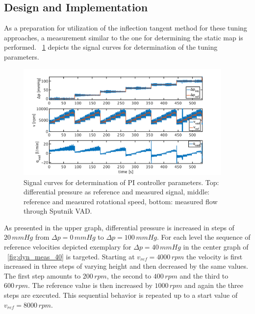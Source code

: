 \subsection{Design and Implementation}
As a preparation for utilization of the inflection tangent method for these tuning approaches, a measurement similar to the one for determining the static map is performed. \figurename~\ref{fig:dyn_meas} depicts the signal curves for determination of the tuning parameters.
\begin{figure}[ht]
  \centering
  \includegraphics[width=0.95\textwidth]{images/chapt_5/dyn_measure.pdf}
  \caption[Signal curves for determination of PI controller parameters]{Signal curves for determination of PI controller parameters. Top: differential pressure as reference and measured signal, middle: reference and measured rotational speed, bottom: measured flow through Sputnik VAD.}
  \label{fig:dyn_meas}
\end{figure}
As presented in the upper graph, differential pressure is increased in steps of $20\,mmHg$ from $\Delta{p}=0\,mmHg$ to $\Delta{p}=100\,mmHg$. For each level the sequence of reference velocities depicted exemplary for $\Delta{p}=40\,mmHg$ in the center graph of \figurename~\ref{fig:dyn_meas_40} is targeted. Starting at $v_{ref}=4000 \, rpm $ the velocity is first increased in three steps of varying height and then decreased by the same values. The first step amounts to $200 \, rpm$, the second to $400\,rpm$ and the third to $600 \, rpm$. The reference value is then increased by $1000\,rpm$ and again the three steps are executed. This sequential behavior is repeated up to a start value of $v_{ref}=8000\,rpm$.
